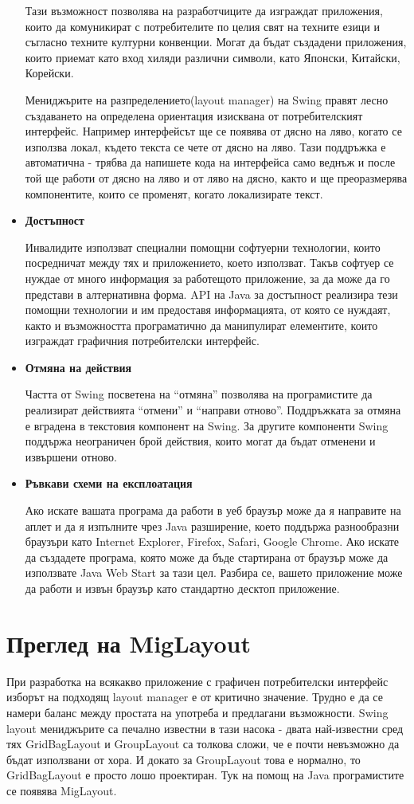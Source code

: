 \begin{itemize}
    Тази възможност позволява на разработчиците да изграждат
    приложения, които да комуникират с потребителите по целия свят на
    техните езици и съгласно техните културни конвенции. Могат да
    бъдат създадени приложения, които приемат като вход хиляди
    различни символи, като Японски, Китайски, Корейски.

    Мениджърите на разпределението(layout manager) на Swing правят
    лесно създаването на определена ориентация изисквана от
    потребителският интерфейс. Например интерфейсът ще се появява от
    дясно на ляво, когато се използва локал, където текста се чете от
    дясно на ляво. Тази поддръжка е автоматична - трябва да напишете
    кода на интерфейса само веднъж и после той ще работи от дясно на
    ляво и от ляво на дясно, както и ще преоразмерява компонентите,
    които се променят, когато локализирате текст.
  \item \textbf{Достъпност}

    Инвалидите използват специални помощни софтуерни технологии, които
    посредничат между тях и приложението, което използват. Такъв
    софтуер се нуждае от много информация за работещото приложение, за
    да може да го представи в алтернативна форма. API на Java за
    достъпност реализира тези помощни технологии и им предоставя
    информацията, от която се нуждаят, както и възможността
    програматично да манипулират елементите, които изграждат графичния
    потребителски интерфейс.
  \item \textbf{Отмяна на действия}

    Частта от Swing посветена на "`отмяна"' позволява на програмистите
    да реализират действията "`отмени"' и "`направи
    отново"'. Поддръжката за отмяна е вградена в текстовия компонент
    на Swing. За другите компоненти Swing поддържа неограничен брой
    действия, които могат да бъдат отменени и извършени отново.
  \item \textbf{Ръвкави схеми на експлоатация}

    Ако искате вашата програма да работи в уеб браузър може да я
    направите на аплет и да я изпълните чрез Java разширение, което
    поддържа разнообразни браузъри като Internet Explorer, Firefox,
    Safari, Google Chrome. Ако искате да създадете програма, която
    може да бъде стартирана от браузър може да използвате Java Web
    Start за тази цел. Разбира се, вашето приложение може да работи и
    извън браузър като стандартно десктоп приложение.
\end{itemize}
\section{Преглед на MigLayout}
При разработка на всякакво приложение с графичен потребителски
интерфейс изборът на подходящ layout manager е от критично
значение. Трудно е да се намери баланс между простата на употреба и
предлагани възможности. Swing layout мениджърите са печално известни в
тази насока - двата най-известни сред тях GridBagLayout и GroupLayout
са толкова сложи, че е почти невъзможно да бъдат използвани от хора. И
докато за GroupLayout това е нормално, то GridBagLayout е просто лошо
проектиран. Тук на помощ на Java програмистите се появява MigLayout.

